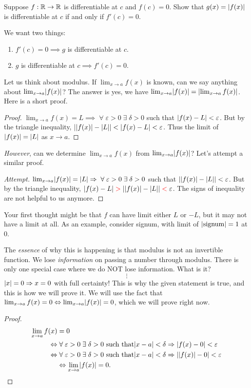 \documentclass[12pt]{article}
\begin{document}
\begin{problem}
    Suppose $f : \mathbb{R} \to \mathbb{R}$ is differentiable at $c$ and $f(c) = 0$.
    Show that $g(x) = \abs{f(x)}$ is differentiable at $c$ if and only if $f'(c) = 0$.
\end{problem}
We want two things:
\begin{enumerate}[label=(\roman*)]
    \item $f'(c) = 0 \implies g$ is differentiable at $c$.
    \item $g$ is differentiable at $c \implies f'(c) = 0$.
\end{enumerate}
Let us think about modulus.
If $\lim_{x \to a} f(x)$ is known, can we say anything about $\lim_{x \to a} \abs{f(x)}$?
The answer is yes, we have $\lim_{x \to a} \abs{f(x)} = \abs{\lim_{x \to a} f(x)}$.
Here is a short proof.
\begin{proof}
    $\lim_{x \to a} f(x) = L \implies \;\forall\; \varepsilon > 0 \;\exists\; \delta > 0$ such that $\abs{f(x) - L} < \varepsilon$. But by the triangle inequality, $\abs{\abs{f(x)} - \abs{L}} < \abs{f(x) - L} < \varepsilon$. Thus the limit of $\abs{f(x)} = \abs{L}$ as $x \to a$.
\end{proof}

\emph{However}, can we determine $\lim_{x \to a} f(x)$ from $\lim_{x \to a} \abs{f(x)}$? Let's attempt a similar proof.
\begin{proof}[Attempt]
    $\lim_{x \to a} \abs{f(x)} = \abs{L} \implies \;\forall\; \varepsilon > 0 \;\exists\; \delta > 0$ such that $\abs{\abs{f(x)} - \abs{L}} < \varepsilon$.
    But by the triangle inequality, $\abs{f(x) - L} \;\textcolor{red}{>}\; \abs{\abs{f(x)} - \abs{L}} \;\textcolor{red}{<}\; \varepsilon$.
    The signs of inequality are not helpful to us anymore.
\end{proof}
Your first thought might be that $f$ can have limit either $L$ or $-L$, but it may not have a limit at all.
As an example, consider signum, with limit of $\abs{\mathrm{signum}} = 1$ at 0.

The \emph{essence} of why this is happening is that modulus is not an invertible function.
We lose \emph{information} on passing a number through modulus.
There is only one special case where we do NOT lose information.
What is it? \[
    \vdots
\] $\abs{x} = 0 \implies x = 0$ with full certainty!
This is why the given statement is true, and this is how we will prove it. 
We will use the fact that $\lim_{x \to a} f(x) = 0 \iff \lim_{x \to a} \abs{f(x)} = 0$, which we will prove right now.
\begin{proof}
    \begin{align*}
        \lim_{x \to a} f(x) &= 0 \\
        \iff &\;\forall\; \varepsilon > 0 \;\exists\; \delta > 0 \text{ such that} \abs{x - a} < \delta \implies \abs{f(x) - 0} < \varepsilon \\
        \iff &\;\forall\; \varepsilon > 0 \;\exists\; \delta > 0 \text{ such that} \abs{x - a} < \delta \implies \abs{\abs{f(x)} - 0} < \varepsilon \\
        &\iff \lim_{x \to a} \abs{f(x)} = 0. \qedhere
    \end{align*}
\end{proof}
\end{document}
